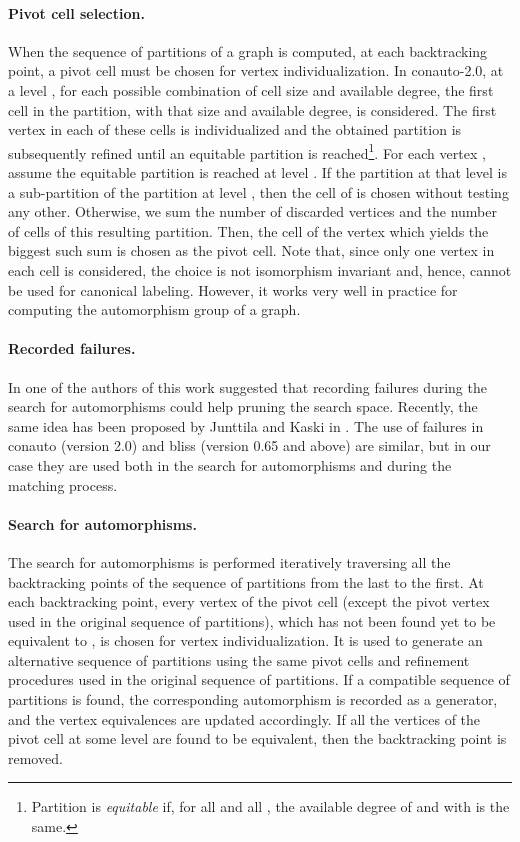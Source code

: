 \paragraph{Pivot cell selection.}
When the sequence of partitions of a graph is computed, at each backtracking point, a pivot cell must be chosen for vertex individualization. In conauto-2.0, at a level , for each possible combination of cell size and available degree, the first cell in the partition, with that size and  available degree, is considered.  
The first vertex in each of these cells is individualized and the obtained partition is subsequently refined until an equitable partition is reached\footnote{Partition  is {\em equitable} if, for all  and all , the available degree of  and  with  is the same.}.
For each vertex , assume the equitable partition is reached at level . If the partition at that level  is a sub-partition of the partition at level , then the cell of  is chosen without testing any other. Otherwise, we sum the number of discarded vertices 
and the number of cells of this resulting partition. Then, the cell of the vertex  which yields the biggest such sum is chosen as the pivot cell. Note that, since only one vertex in each cell is considered, the choice is not isomorphism invariant and, hence, cannot be used for canonical labeling. However, it works very well in practice for computing the automorphism group of a graph.

\paragraph{Recorded failures.}
In \cite{jllopez2009} one of the authors of this work suggested that recording failures during the search for automorphisms could help pruning the search space. Recently, the same idea has been proposed by Junttila and Kaski in \cite{springerlink:10.1007/978-3-642-19754-3_16}. The use of failures in conauto (version 2.0) and bliss (version 0.65 and above) are similar, but in our case they are used both in the search for automorphisms and during the matching process.

\paragraph{Search for automorphisms.}
The search for automorphisms is performed iteratively traversing all the backtracking points of the sequence of partitions from the last to the first. At each backtracking point, every vertex of the pivot cell (except the pivot vertex  used in the original sequence of partitions), which has not been found yet to be equivalent to , is chosen for vertex individualization. It is used to generate an alternative sequence of partitions using the same pivot cells and refinement procedures used in the original sequence of partitions. If a compatible sequence of partitions is found, the corresponding automorphism is recorded as a generator, and the vertex equivalences are updated accordingly. If all the vertices of the pivot cell at some level are found to be equivalent, then the backtracking point is removed.

